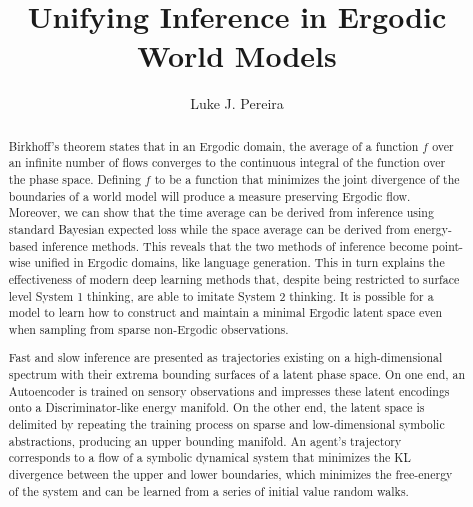 \documentclass{article}
\title{Unifying Inference in Ergodic World Models}
\author{%
  Luke J. Pereira \\
}
\begin{document}
\maketitle

\begin{abstract}
Birkhoff's theorem states that in an Ergodic domain, the average of a function $f$ over an infinite number of flows converges to the continuous integral of the function over the phase space. Defining $f$ to be a function that minimizes the joint divergence of the boundaries of a world model will produce a measure preserving Ergodic flow. Moreover, we can show that the time average can be derived from inference using standard Bayesian expected loss while the space average can be derived from energy-based inference methods. This reveals that the two methods of inference become point-wise unified in Ergodic domains, like language generation. This in turn explains the effectiveness of modern deep learning methods that, despite being restricted to surface level System 1 thinking, are able to imitate System 2 thinking. It is possible for a model to learn how to construct and maintain a minimal Ergodic latent space even when sampling from sparse non-Ergodic observations.

Fast and slow inference are presented as trajectories existing on a high-dimensional spectrum with their extrema bounding surfaces of a latent phase space. On one end, an Autoencoder is trained on sensory observations and impresses these latent encodings onto a Discriminator-like energy manifold. On the other end, the latent space is delimited by repeating the training process on sparse and low-dimensional symbolic abstractions, producing an upper bounding manifold. An agent's trajectory corresponds to a flow of a symbolic dynamical system that minimizes the KL divergence between the upper and lower boundaries, which minimizes the free-energy of the system and can be learned from a series of initial value random walks.



\end{abstract}
\end{document}
